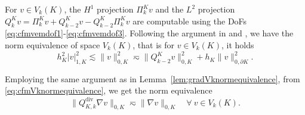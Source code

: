 \documentclass[10pt]{amsart}
\renewcommand{\div}{\operatorname{div}}
\numberwithin{equation}{section}
\begin{document}
For $v\in V_k(K)$, the $H^1$ projection $\Pi_k^Kv$ and the $L^2$ projection $Q_k^Kv= \Pi_k^Kv + Q_{k-2}^Kv-Q_{k-2}^K\Pi_k^Kv$ are computable using the DoFs \eqref{eq:cfmvemdof1}-\eqref{eq:cfmvemdof3}. 
Following the argument in \cite[Lemma 4.7]{ChenHuangWei2022} and \cite{ChenHuang2018,BrennerSung2018,BeiraodaVeigaLovadinaRusso2017},
we have the norm equivalence of space $V_k(K)$, that is for $v\in V_k(K)$, it holds
\begin{equation}\label{eq:cfmVknormequivalence}
h_K^2|v|_{1,K}^2\lesssim\|v\|_{0,K}^2\eqsim \|Q_{k-2}^Kv\|_{0,K}^2 + h_K\|v\|_{0,\partial K}^2.
\end{equation}

Employing the same argument as in Lemma~\ref{lem:gradVknormequivalence}, from  \eqref{eq:cfmVknormequivalence}, we get the norm equivalence
\begin{equation*}%
\|Q_{K,k}^{\div}\nabla v\|_{0,K}\eqsim \|\nabla v\|_{0,K} \quad \forall~v\in V_k(K).
\end{equation*}
\end{document}
